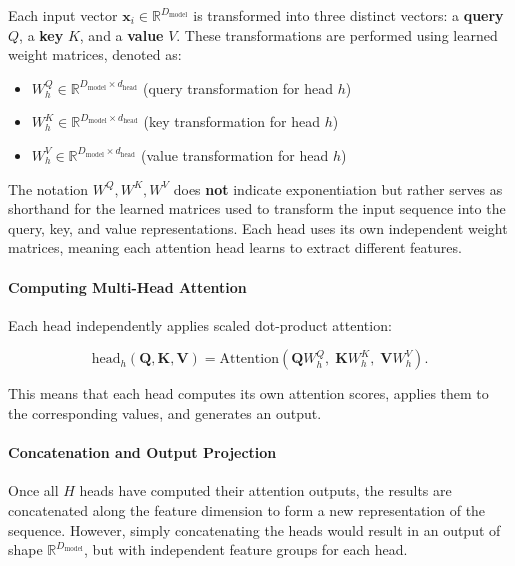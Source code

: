 \noindent Each input vector \( \mathbf{x}_i \in \mathbb{R}^{D_{\text{model}}} \) is transformed into three distinct vectors: a \textbf{query} \( Q \), a \textbf{key} \( K \), and a \textbf{value} \( V \). These transformations are performed using learned weight matrices, denoted as:

\begin{itemize}
    \item \( W_h^Q \in \mathbb{R}^{D_{\text{model}} \times d_{\text{head}}} \) (query transformation for head \( h \))
    \item \( W_h^K \in \mathbb{R}^{D_{\text{model}} \times d_{\text{head}}} \) (key transformation for head \( h \))
    \item \( W_h^V \in \mathbb{R}^{D_{\text{model}} \times d_{\text{head}}} \) (value transformation for head \( h \))
\end{itemize}

\noindent The notation \( W^Q, W^K, W^V \) does \textbf{not} indicate exponentiation but rather serves as shorthand for the learned matrices used to transform the input sequence into the query, key, and value representations. Each head uses its own independent weight matrices, meaning each attention head learns to extract different features.

\paragraph{Computing Multi-Head Attention} 
\noindent Each head independently applies scaled dot-product attention:

\[
\text{head}_h(\mathbf{Q},\mathbf{K},\mathbf{V})
=
\text{Attention}\left(\mathbf{Q}W^Q_h,\;\mathbf{K}W^K_h,\;\mathbf{V}W^V_h\right).
\]

\noindent This means that each head computes its own attention scores, applies them to the corresponding values, and generates an output.

\paragraph{Concatenation and Output Projection} 
\noindent Once all \( H \) heads have computed their attention outputs, the results are concatenated along the feature dimension to form a new representation of the sequence. However, simply concatenating the heads would result in an output of shape \( \mathbb{R}^{D_{\text{model}}} \), but with independent feature groups for each head. 

